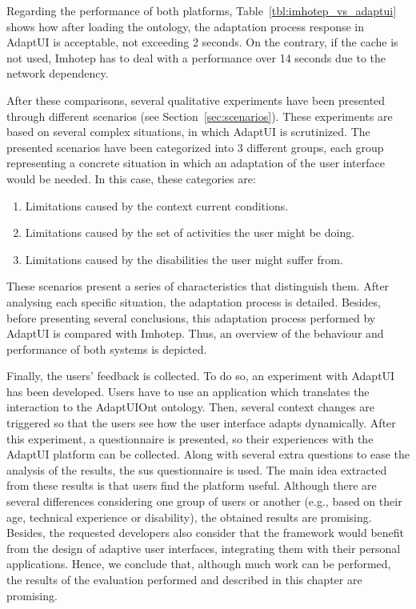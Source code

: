 Regarding the performance of both platforms, Table~\ref{tbl:imhotep_vs_adaptui}
shows how after loading the ontology, the adaptation process response in AdaptUI
is acceptable, not exceeding 2 seconds. On the contrary, if the cache is not
used, Imhotep has to deal with a performance over 14 seconds due to the network
dependency.


After these comparisons, several qualitative experiments have been presented 
through different scenarios (see Section~\ref{sec:scenarios}). These experiments 
are based on several complex situations, in which AdaptUI is scrutinized.
The presented scenarios have been categorized into 3 different groups, each 
group representing a concrete situation in which an adaptation of the user 
interface would be needed. In this case, these categories are:

\begin{enumerate}[label=\alph{*}]
  \item Limitations caused by the context current conditions.
  \item Limitations caused by the set of activities the user might be doing.
  \item Limitations caused by the disabilities the user might suffer from.
\end{enumerate}

These scenarios present a series of characteristics that distinguish them. After
analysing each specific situation, the adaptation process is detailed. Besides,
before presenting several conclusions, this adaptation process performed by 
AdaptUI is compared with Imhotep. Thus, an overview of the behaviour and 
performance of both systems is depicted.

Finally, the users' feedback is collected. To do so, an experiment with AdaptUI 
has been developed. Users have to use an application which translates the 
interaction to the AdaptUIOnt ontology. Then, several context changes are 
triggered so that the users see how the user interface adapts dynamically. After 
this experiment, a questionnaire is presented, so their experiences with the 
AdaptUI platform can be collected. Along with several extra questions to ease 
the analysis of the results, the \ac{sus} questionnaire is used. The main idea 
extracted from these results is that users find the platform useful. Although 
there are several differences considering one group of users or another (e.g., 
based on their age, technical experience or disability), the obtained results 
are promising. Besides, the requested developers also consider that the 
framework would benefit from the design of adaptive user interfaces, integrating 
them with their personal applications. Hence, we conclude that, although much work 
can be performed, the results of the evaluation performed and described in this 
chapter are promising.